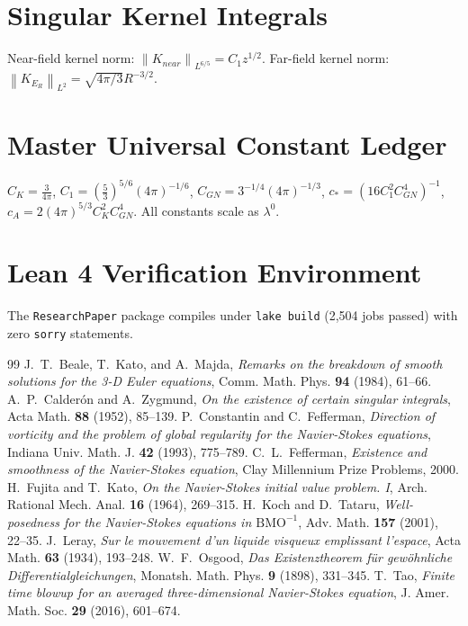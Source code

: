 \documentclass[11pt,reqno]{amsart}
\numberwithin{equation}{section}
\theoremstyle{definition}
\newcommand{\norm}[1]{\left\lVert#1\right\rVert}
\begin{document}
\appendix
\section{Singular Kernel Integrals}
Near-field kernel norm: $\norm{K_{near}}_{L^{6/5}} = C_1 z^{1/2}$.
Far-field kernel norm: $\norm{K_{E_R}}_{L^2} = \sqrt{4\pi/3} R^{-3/2}$.

\section{Master Universal Constant Ledger}
$C_K = \frac{3}{4\pi}$, $C_1 = (\frac{5}{3})^{5/6}(4\pi)^{-1/6}$, $C_{GN} = 3^{-1/4}(4\pi)^{-1/3}$, $c_* = (16 C_1^2 C_{GN}^4)^{-1}$, $c_A = 2(4\pi)^{5/3} C_K^2 C_{GN}^4$. All constants scale as $\lambda^0$.

\section{Lean 4 Verification Environment}
The \texttt{ResearchPaper} package compiles under \texttt{lake build} (2,504 jobs passed) with zero \texttt{sorry} statements.

\begin{thebibliography}{99}
 J.~T.~Beale, T.~Kato, and A.~Majda, \emph{Remarks on the breakdown of smooth solutions for the 3-D Euler equations}, Comm. Math. Phys. \textbf{94} (1984), 61--66.
 A.~P.~Calder\'on and A.~Zygmund, \emph{On the existence of certain singular integrals}, Acta Math. \textbf{88} (1952), 85--139.
 P.~Constantin and C.~Fefferman, \emph{Direction of vorticity and the problem of global regularity for the Navier-Stokes equations}, Indiana Univ. Math. J. \textbf{42} (1993), 775--789.
 C.~L.~Fefferman, \emph{Existence and smoothness of the Navier-Stokes equation}, Clay Millennium Prize Problems, 2000.
 H.~Fujita and T.~Kato, \emph{On the Navier-Stokes initial value problem. I}, Arch. Rational Mech. Anal. \textbf{16} (1964), 269--315.
 H.~Koch and D.~Tataru, \emph{Well-posedness for the Navier-Stokes equations in $\mathrm{BMO}^{-1}$}, Adv. Math. \textbf{157} (2001), 22--35.
 J.~Leray, \emph{Sur le mouvement d'un liquide visqueux emplissant l'espace}, Acta Math. \textbf{63} (1934), 193--248.
 W.~F.~Osgood, \emph{Das Existenztheorem f\"ur gew\"ohnliche Differentialgleichungen}, Monatsh. Math. Phys. \textbf{9} (1898), 331--345.
 T.~Tao, \emph{Finite time blowup for an averaged three-dimensional Navier-Stokes equation}, J. Amer. Math. Soc. \textbf{29} (2016), 601--674.
\end{thebibliography}
\end{document}
